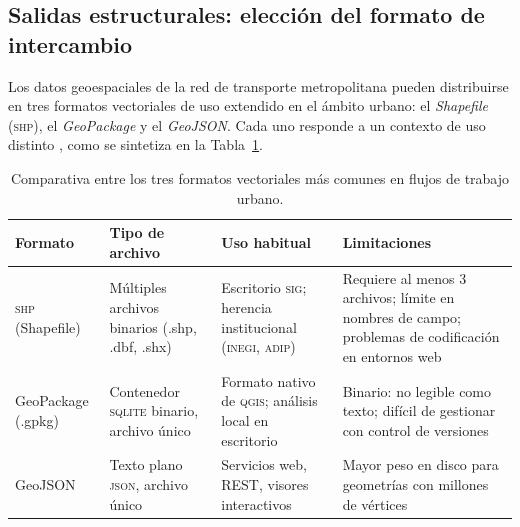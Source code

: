 
\subsection{Salidas estructurales: elección del formato de intercambio}
\label{subsec:estructura-geojson}

Los datos geoespaciales de la red de transporte metropolitana pueden
distribuirse en tres formatos vectoriales de uso extendido en el ámbito urbano:
el \textit{Shapefile} (\textsc{shp}), el \textit{GeoPackage} y el
\textit{GeoJSON}. Cada uno responde a un contexto de uso distinto
\citep{longley2015}, como se sintetiza en la
Tabla~\ref{tab:formatos-geoespaciales}.

\begin{table}[H]
    \centering
    \small
    \begin{tabular}{|p{2.2cm}|p{3.2cm}|p{3.8cm}|p{4.2cm}|}
        \hline
        \textbf{Formato} & \textbf{Tipo de archivo} &
        \textbf{Uso habitual} & \textbf{Limitaciones} \\ \hline
        \textsc{shp} (Shapefile) &
        Múltiples archivos binarios (.shp, .dbf, .shx)
        \citep{esri1998shapefile} &
        Escritorio \textsc{sig}; herencia institucional
        (\textsc{inegi}, \textsc{adip}) &
        Requiere al menos 3 archivos; límite en nombres de campo;
        problemas de codificación en entornos web \\ \hline
        GeoPackage (.gpkg) &
        Contenedor \textsc{sqlite} binario, archivo único
        \citep{ogc2014geopackage} &
        Formato nativo de \textsc{qgis}; análisis local en
        escritorio &
        Binario: no legible como texto; difícil de gestionar con
        control de versiones \\ \hline
        GeoJSON &
        Texto plano \textsc{json}, archivo único
        \citep{butler2016geojson} &
        Servicios web, \api{} REST, visores interactivos &
        Mayor peso en disco para geometrías con millones de
        vértices \\ \hline
    \end{tabular}
    \caption[Comparativa de formatos de datos geoespaciales]{Comparativa
    entre los tres formatos vectoriales más comunes en flujos de trabajo
    urbano.}
    \label{tab:formatos-geoespaciales}
\end{table}

